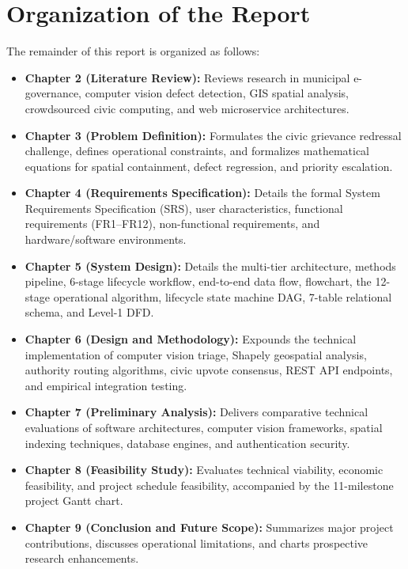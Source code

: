 \documentclass[12pt,a4paper]{report}
\begin{document}
\section{Organization of the Report}
The remainder of this report is organized as follows:
\begin{itemize}
    \item \textbf{Chapter 2 (Literature Review):} Reviews research in municipal e-governance, computer vision defect detection, GIS spatial analysis, crowdsourced civic computing, and web microservice architectures.
    \item \textbf{Chapter 3 (Problem Definition):} Formulates the civic grievance redressal challenge, defines operational constraints, and formalizes mathematical equations for spatial containment, defect regression, and priority escalation.
    \item \textbf{Chapter 4 (Requirements Specification):} Details the formal System Requirements Specification (SRS), user characteristics, functional requirements (FR1--FR12), non-functional requirements, and hardware/software environments.
    \item \textbf{Chapter 5 (System Design):} Details the multi-tier architecture, methods pipeline, 6-stage lifecycle workflow, end-to-end data flow, flowchart, the 12-stage operational algorithm, lifecycle state machine DAG, 7-table relational schema, and Level-1 DFD.
    \item \textbf{Chapter 6 (Design and Methodology):} Expounds the technical implementation of computer vision triage, Shapely geospatial analysis, authority routing algorithms, civic upvote consensus, REST API endpoints, and empirical integration testing.
    \item \textbf{Chapter 7 (Preliminary Analysis):} Delivers comparative technical evaluations of software architectures, computer vision frameworks, spatial indexing techniques, database engines, and authentication security.
    \item \textbf{Chapter 8 (Feasibility Study):} Evaluates technical viability, economic feasibility, and project schedule feasibility, accompanied by the 11-milestone project Gantt chart.
    \item \textbf{Chapter 9 (Conclusion and Future Scope):} Summarizes major project contributions, discusses operational limitations, and charts prospective research enhancements.
\end{itemize}


\end{document}
